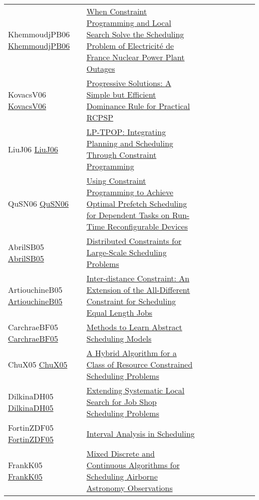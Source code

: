 {\begin{longtable}{p{3cm}p{7cm}lllllll}
KhemmoudjPB06 \href{https://doi.org/10.1007/11889205\_21}{KhemmoudjPB06} &  \href{papers/KhemmoudjPB06.pdf}{When Constraint Programming and Local Search Solve the Scheduling Problem of Electricit{\'{e}} de France Nuclear Power Plant Outages} &  &  &  &  &  &  & \\
KovacsV06 \href{https://doi.org/10.1007/11757375\_13}{KovacsV06} &  \href{papers/KovacsV06.pdf}{Progressive Solutions: {A} Simple but Efficient Dominance Rule for Practical {RCPSP}} &  &  &  &  &  &  & \\
LiuJ06 \href{https://doi.org/10.1007/11801603\_92}{LiuJ06} &  \href{papers/LiuJ06.pdf}{{LP-TPOP:} Integrating Planning and Scheduling Through Constraint Programming} &  &  &  &  &  &  & \\
QuSN06 \href{https://doi.org/10.1109/ISSOC.2006.321973}{QuSN06} &  \href{papers/QuSN06.pdf}{Using Constraint Programming to Achieve Optimal Prefetch Scheduling for Dependent Tasks on Run-Time Reconfigurable Devices} &  &  &  &  &  &  & \\
AbrilSB05 \href{https://doi.org/10.1007/11564751\_75}{AbrilSB05} &  \href{papers/AbrilSB05.pdf}{Distributed Constraints for Large-Scale Scheduling Problems} &  &  &  &  &  &  & \\
ArtiouchineB05 \href{https://doi.org/10.1007/11564751\_8}{ArtiouchineB05} &  \href{papers/ArtiouchineB05.pdf}{Inter-distance Constraint: An Extension of the All-Different Constraint for Scheduling Equal Length Jobs} &  &  &  &  &  &  & \\
CarchraeBF05 \href{https://doi.org/10.1007/11564751\_80}{CarchraeBF05} &  \href{papers/CarchraeBF05.pdf}{Methods to Learn Abstract Scheduling Models} &  &  &  &  &  &  & \\
ChuX05 \href{https://doi.org/10.1007/11493853\_10}{ChuX05} &  \href{papers/ChuX05.pdf}{A Hybrid Algorithm for a Class of Resource Constrained Scheduling Problems} &  &  &  &  &  &  & \\
DilkinaDH05 \href{https://doi.org/10.1007/11564751\_60}{DilkinaDH05} &  \href{papers/DilkinaDH05.pdf}{Extending Systematic Local Search for Job Shop Scheduling Problems} &  &  &  &  &  &  & \\
FortinZDF05 \href{https://doi.org/10.1007/11564751\_19}{FortinZDF05} &  \href{papers/FortinZDF05.pdf}{Interval Analysis in Scheduling} &  &  &  &  &  &  & \\
FrankK05 \href{https://doi.org/10.1007/11493853\_15}{FrankK05} &  \href{papers/FrankK05.pdf}{Mixed Discrete and Continuous Algorithms for Scheduling Airborne Astronomy Observations} &  &  &  &  &  &  & \\

\end{longtable}}
